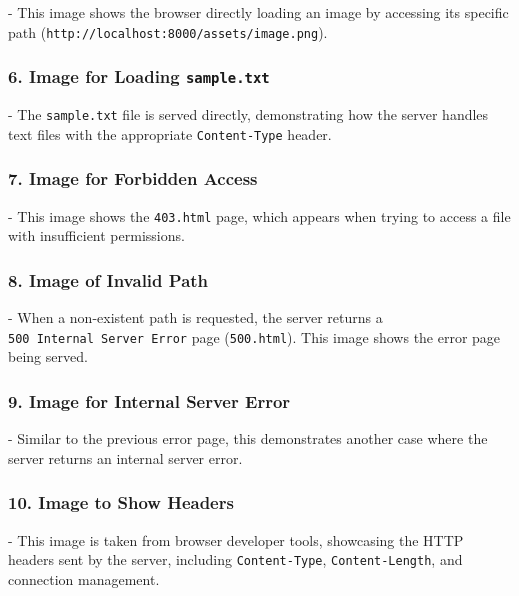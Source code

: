 - This image shows the browser directly loading an image by accessing
its specific path (\texttt{http://localhost:8000/assets/image.png}).

\subsubsection{\texorpdfstring{6. Image for Loading
\texttt{sample.txt}}{6. Image for Loading sample.txt}}\label{image-for-loading-sample.txt}

- The \texttt{sample.txt} file is served directly, demonstrating how the
server handles text files with the appropriate \texttt{Content-Type}
header.

\subsubsection{7. Image for Forbidden
Access}\label{image-for-forbidden-access}

- This image shows the \texttt{403.html} page, which appears when trying
to access a file with insufficient permissions.

\subsubsection{8. Image of Invalid Path}\label{image-of-invalid-path}

- When a non-existent path is requested, the server returns a
\texttt{500\ Internal\ Server\ Error} page (\texttt{500.html}). This
image shows the error page being served.

\subsubsection{9. Image for Internal Server
Error}\label{image-for-internal-server-error}

 -
Similar to the previous error page, this demonstrates another case where
the server returns an internal server error.

\subsubsection{10. Image to Show Headers}\label{image-to-show-headers}

- This image is taken from browser developer tools, showcasing the HTTP
headers sent by the server, including \texttt{Content-Type},
\texttt{Content-Length}, and connection management.
